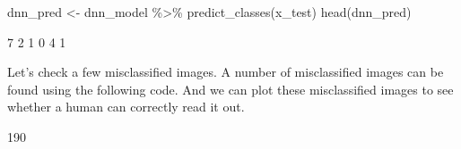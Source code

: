 \documentclass[
  12pt,
]{krantz}
\makeatletter
\newenvironment{Shaded}{\begin{snugshade}}{\end{snugshade}}
\newcommand{\DocumentationTok}[1]{\textcolor[rgb]{0.37,0.37,0.37}{\textbf{\textit{#1}}}}
\newcommand{\FunctionTok}[1]{\textcolor[rgb]{0,0,0}{#1}}
\newcommand{\NormalTok}[1]{#1}
\newcommand{\OtherTok}[1]{\textcolor[rgb]{0.37,0.37,0.37}{#1}}
\newcommand{\SpecialCharTok}[1]{\textcolor[rgb]{0,0,0}{#1}}
\newenvironment{kframe}{%
\medskip{}
\setlength{\fboxsep}{.8em}
 \def\at@end@of@kframe{}%
 \ifinner\ifhmode%
  \def\at@end@of@kframe{\end{minipage}}%
  \begin{minipage}{\columnwidth}%
 \fi\fi%
 \def\FrameCommand##1{\hskip\@totalleftmargin \hskip-\fboxsep
 \colorbox{shadecolor}{##1}\hskip-\fboxsep
     \hskip-\linewidth \hskip-\@totalleftmargin \hskip\columnwidth}%
 \MakeFramed {\advance\hsize-\width
   \@totalleftmargin\z@ \linewidth\hsize
   \@setminipage}}%
 {\par\unskip\endMakeFramed%
 \at@end@of@kframe}
\renewenvironment{Shaded}{\begin{kframe}}{\end{kframe}}
\makeatother
\begin{document}
\begin{Shaded}
\begin{Highlighting}[]
\NormalTok{dnn\_pred }\OtherTok{\textless{}{-}}\NormalTok{ dnn\_model }\SpecialCharTok{\%\textgreater{}\%} 
              \FunctionTok{predict\_classes}\NormalTok{(x\_test)}
\FunctionTok{head}\NormalTok{(dnn\_pred)}
\end{Highlighting}
\end{Shaded}

\begin{Shaded}
\begin{Highlighting}[]
\NormalTok{ [1] 7 2 1 0 4 1}
\end{Highlighting}
\end{Shaded}

Let's check a few misclassified images. A number of misclassified images can be found using the following code. And we can plot these misclassified images to see whether a human can correctly read it out.

\begin{Shaded}
\end{Shaded}

\begin{Shaded}
\begin{Highlighting}[]
\NormalTok{[1] 190}
\end{Highlighting}
\end{Shaded}
\end{document}
